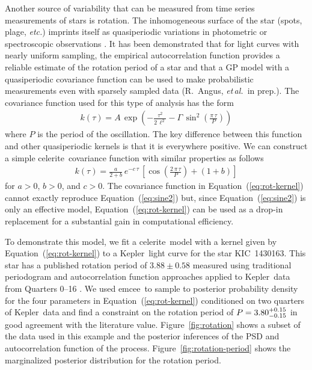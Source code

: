 \documentclass[manuscript, letterpaper]{aastex6}
\newcommand{\project}[1]{\textsf{#1}}
\newcommand{\kepler}{\project{Kepler}}
\newcommand{\celerite}{\project{celerite}}
\newcommand{\emcee}{\project{emcee}}
\newcommand{\foreign}[1]{\emph{#1}}
\newcommand{\etal}{\foreign{et\,al.}}
\newcommand{\etc}{\foreign{etc.}}
\newcommand{\figureref}[1]{\ref{fig:#1}}
\newcommand{\Figure}[1]{Figure~\figureref{#1}}
\renewcommand{\eqref}[1]{\ref{eq:#1}}
\newcommand{\Eq}[1]{Equation~(\eqref{#1})}
\newcommand{\eq}[1]{\Eq{#1}}
\newcommand{\eqlabel}[1]{\label{eq:#1}}
\begin{document}
Another source of variability that can be measured from time series
measurements of stars is rotation.
The inhomogeneous surface of the star (spots, plage, \etc) imprints itself as
quasiperiodic variations in photometric or spectroscopic observations
\citep{Dumusque:2014}.
It has been demonstrated that for light curves with nearly uniform sampling,
the empirical autocorrelation function provides a reliable estimate of the
rotation period of a star \citep{Aigrain:2015} and that a GP model with a
quasiperiodic covariance function can be used to make probabilistic
measurements even with sparsely sampled data (R.~Angus, \etal\ in prep.).
The covariance function used for this type of analysis has the form
\begin{eqnarray}\eqlabel{sine2}
k(\tau) = A\,\exp\left(-\frac{\tau^2}{2\,\ell^2} -
    \Gamma\,\sin^2\left(\frac{\pi\,\tau}{P} \right) \right)
\end{eqnarray}
where $P$ is the period of the oscillation.
The key difference between this function and other quasiperiodic kernels is
that it is everywhere positive.
We can construct a simple \celerite\ covariance function with similar properties
as follows
\begin{eqnarray}\eqlabel{rot-kernel}
k(\tau) = \frac{a}{2+b}\,e^{-c\,\tau}\,\left[
    \cos\left(\frac{2\,\pi\,\tau}{P}\right) + (1 + b)
\right]
\end{eqnarray}
for $a>0$, $b>0$, and $c>0$.
The covariance function in \eq{rot-kernel} cannot exactly reproduce \eq{sine2}
but, since \eq{sine2} is only an effective model, \eq{rot-kernel} can be used
as a drop-in replacement for a substantial gain in computational efficiency.

To demonstrate this model, we fit a \celerite\ model with a kernel given by
\eq{rot-kernel} to a \kepler\ light curve for the star KIC~1430163.
This star has a published rotation period of $3.88 \pm 0.58$ measured using
traditional periodogram and autocorrelation function approaches applied to
\kepler\ data from Quarters 0--16 \citep{Mathur:2014}.
We used \emcee\ to sample to posterior probability density for the four
parameters in \eq{rot-kernel} conditioned on two quarters of \kepler\ data and
find a constraint on the rotation period of $P = {3.80_{-0.15}^{+0.15} }$ in good
agreement with the literature value.
\Figure{rotation} shows a subset of the data used in this example and the
posterior inferences of the PSD and autocorrelation function of the process.
\Figure{rotation-period} shows the marginalized posterior distribution for the
rotation period.
\end{document}
